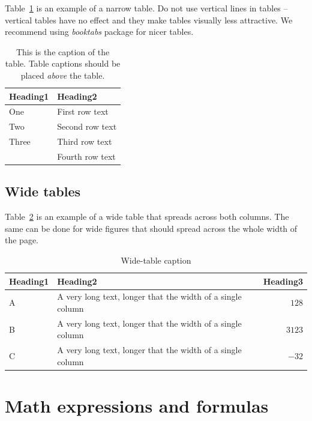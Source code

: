 \documentclass[10pt, a4paper]{article}
\begin{document}
Table~\ref{tab:narrow-table} is an example of a narrow table. Do not use vertical lines in tables -- vertical tables have no effect and they make tables visually less attractive. We recommend using \textit{booktabs} package for nicer tables.

\begin{table}
\caption{This is the caption of the table. Table captions should be placed \textit{above} the table.}
\label{tab:narrow-table}
\begin{center}
\begin{tabular}{ll}
\toprule
Heading1 & Heading2 \\
\midrule
One & First row text \\
Two   & Second row text \\
Three   & Third row text \\
      & Fourth row text \\
\bottomrule
\end{tabular}
\end{center}
\end{table}

\subsection{Wide tables}

Table~\ref{tab:wide-table} is an example of a wide table that spreads across both columns. The same can be done for wide figures that should spread across the whole width of the page. 

\begin{table}
\caption{Wide-table caption}
\label{tab:wide-table}
\begin{center}
\begin{tabular}{llr}
\toprule
Heading1 & Heading2 & Heading3\\
\midrule
A & A very long text, longer that the width of a single column & $128$\\
B & A very long text, longer that the width of a single column & $3123$\\
C & A very long text, longer that the width of a single column & $-32$\\
\bottomrule
\end{tabular}
\end{center}
\end{table}

\section{Math expressions and formulas}
\end{document}
